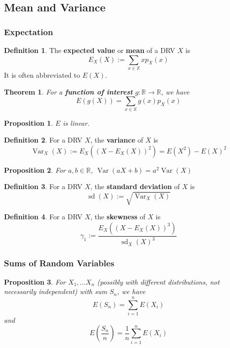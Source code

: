 \documentclass[12pt]{article}
\newtheorem{thm}{Theorem}[section]
\newtheorem*{prop*}{Proposition}
\theoremstyle{definition}
\newtheorem{defn}{Definition}[subsection]
\newcommand{\R}{\mathbb{R}}
\newcommand{\X}{\mathbb{X}}
\DeclareMathOperator{\Var}{Var}
\DeclareMathOperator{\sd}{sd}
\begin{document}
\subsection{Mean and Variance}

\subsubsection{Expectation}

\begin{defn}
  The \textbf{expected value} or \textbf{mean} of a DRV $X$ is
  $$E_X(X) := \sum_{x \in \X}xp_X(x)$$
  It is often abbreviated to $E(X)$.
\end{defn}


\begin{thm}
  For a \textbf{function of interest} $g : \R \to \R$, we have
  $$E(g(X)) = \sum_{x \in \X}g(x)p_X(x)$$
\end{thm}

\begin{prop*}
  $E$ is linear.
\end{prop*}


\begin{defn}
  For a DRV $X$, the \textbf{variance} of $X$ is
  $$\Var_X(X) := E_X\left((X - E_X(X))^2\right) = E(X^2) - E(X)^2$$
\end{defn}

\begin{prop*}
  For $a, b \in \R$, $\Var(aX + b) = a^2\Var(X)$
\end{prop*}

\begin{defn}
  For a DRV $X$, the \textbf{standard deviation} of $X$ is
  $$\sd(X) := \sqrt{\Var_X(X)}$$
\end{defn}

\begin{defn}
  For a DRV $X$, the \textbf{skewness} of $X$ is
  $$\gamma_1 := \frac{E_X((X - E_X(X))^3)}{\sd_X(X)^3}$$
\end{defn}

\subsubsection{Sums of Random Variables}

\begin{prop*}
  For $X_1, \ldots X_n$ (possibly with different distributions, not necessarily independent) with sum $S_n$, we have
  $$E(S_n) = \sum_{i = 1}^nE(X_i)$$
  and
  $$E\left(\frac{S_n}{n}\right) = \frac{1}{n}\sum_{i = 1}^nE(X_i)$$
\end{prop*}
\end{document}
